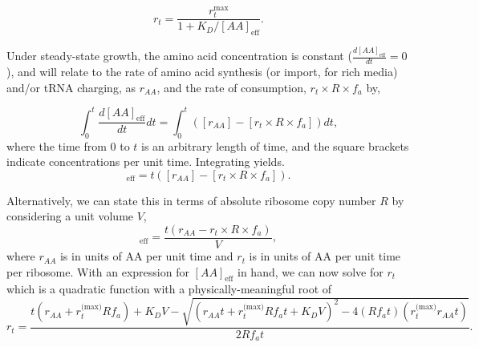 \begin{equation}
r_t = \frac{r_{t}^{\text{max}}}{1 + K_D/[AA]_{\text{eff}}}.
\label{eq:rt_kd_simple}
\end{equation}

Under steady-state growth, the amino acid concentration is constant
($\frac{d[AA]_\text{eff}}{dt}=0$), and will relate to the rate of amino acid
synthesis (or import, for rich media) and/or tRNA charging, as $r_{AA}$, and the
rate of consumption, $r_t\times R \times f_a$ by,

\begin{equation}
\int_{0}^{t} \frac{d[AA]_{\text{eff}}}{dt} dt =  \int_{0}^{t}([r_{AA}] - [r_t\times R \times f_a]) dt,
\label{eq:aaeff_int}
\end{equation}
where the time from 0 to $t$ is an arbitrary length of time, and the square
brackets indicate concentrations per unit time.
Integrating  yields.
\begin{equation}
[AA]_{\text{eff}} =  t([r_{AA}] - [r_t \times R \times f_a]).
\label{eq:aaeff_concs}
\end{equation}

Alternatively, we can state this in terms of absolute ribosome copy number $R$
by considering a unit volume $V$,
\begin{equation}
   [AA]_\text{eff} = \frac{t(r_{AA} - r_t \times R \times f_a)}{V},
   \label{eq:aa_final}
\end{equation}
where $r_{AA}$ is in units of AA per unit time and $r_t$ is in units of AA per
unit time per ribosome. With an expression for $[AA]_\text{eff}$ in hand, we can now solve
 for $r_t$ which is a quadratic function with a
physically-meaningful root of
\begin{equation}
r_t = \frac{t(r_{AA} + r_t^\text{(max)}Rf_a) + K_D V - \sqrt{(r_{AA}t + r_t^\text{(max)}Rf_at + K_D V)^2 - 4(Rf_at)(r_t^\text{(max)}r_{AA} t)}}{2Rf_at}.
\label{eq:rt_root}
\end{equation}

